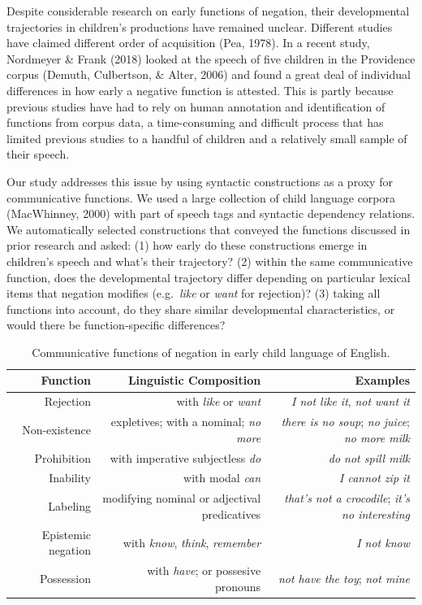\documentclass[10pt, letterpaper]{article}
\begin{document}
Despite considerable research on early functions of negation, their
developmental trajectories in children's productions have remained
unclear. Different studies have claimed different order of acquisition
(Pea, 1978). In a recent study, Nordmeyer \& Frank (2018) looked at the
speech of five children in the Providence corpus (Demuth, Culbertson, \&
Alter, 2006) and found a great deal of individual differences in how
early a negative function is attested. This is partly because previous
studies have had to rely on human annotation and identification of
functions from corpus data, a time-consuming and difficult process that
has limited previous studies to a handful of children and a relatively
small sample of their speech.

Our study addresses this issue by using syntactic constructions as a
proxy for communicative functions. We used a large collection of child
language corpora (MacWhinney, 2000) with part of speech tags and
syntactic dependency relations. We automatically selected constructions
that conveyed the functions discussed in prior research and asked: (1)
how early do these constructions emerge in children's speech and what's
their trajectory? (2) within the same communicative function, does the
developmental trajectory differ depending on particular lexical items
that negation modifies (e.g.~\emph{like} or \emph{want} for rejection)?
(3) taking all functions into account, do they share similar
developmental characteristics, or would there be function-specific
differences?

\begin{table}[h]
\small
\centering
\begin{tabular}{rrr}
  \hline
 \textbf{Function} & \textbf{Linguistic Composition} & \textbf{Examples} \\
  \hline
Rejection & with \textit{like} or \textit{want} & \textit{I not like it}, \textit{not want it}  \\
Non-existence & expletives; with a nominal; \textit{no more} & \textit{there is no soup}; \textit{no juice}; \textit{no more milk} \\
Prohibition & with imperative subjectless \textit{do} & \textit{do not spill milk} \\
Inability & with modal \textit{can} & \textit{I cannot zip it} \\
Labeling & modifying nominal or adjectival predicatives & \textit{that's not a crocodile}; \textit{it's no interesting} \\
Epistemic negation & with \textit{know}, \textit{think}, \textit{remember}  & \textit{I not know} \\
Possession & with \textit{have}; or possesive pronouns & \textit{not have the toy}; \textit{not mine} \\
   \hline
\end{tabular}
\caption{Communicative functions of negation in early child language of English.}
\end{table}
\end{document}
